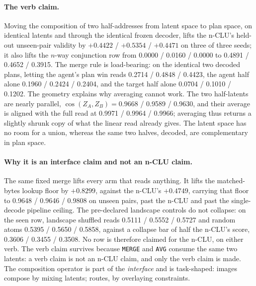 \documentclass{article} %
\begin{document}
\paragraph{The verb claim.} Moving the composition of two half-addresses from latent space to
plan space, on identical latents and through the identical frozen decoder, lifts the n-CLU's
held-out unseen-pair validity by $+0.4422$ / $+0.5354$ / $+0.4471$ on three of three seeds; it
also lifts the $n$-way conjunction row from 0.0000 / 0.0160 / 0.0000 to 0.4891 / 0.4652 / 0.3915.
The merge rule is load-bearing: on the identical two decoded plans, letting the agent's plan
win reads 0.2714 / 0.4848 / 0.4423, the agent half alone 0.1960 / 0.2424 / 0.2404, and the target
half alone 0.0704 / 0.1010 / 0.1202. %
The geometry explains why averaging cannot work. The two half-latents are nearly parallel,
$\cos(Z_A,Z_B)=0.9668$ / 0.9589 / 0.9630, and their average is aligned with the full read at
0.9971 / 0.9964 / 0.9966; averaging thus returns a slightly shrunk copy of what the linear read
already gives. The latent space has no room for a union, whereas the same two halves, decoded,
are complementary in plan space. %

\paragraph{Why it is an interface claim and not an n-CLU claim.} The same fixed merge lifts every
arm that reads anything. It lifts the matched-bytes lookup floor by $+0.8299$, against the
n-CLU's $+0.4749$, carrying that floor to 0.9648 / 0.9646 / 0.9808 on unseen pairs, past the
n-CLU and past the single-decode pipeline ceiling. %
The pre-declared landscape controls do not collapse: on the seen row, landscape shuffled reads 0.5111
/ 0.5552 / 0.5727 and random atoms 0.5395 / 0.5650 / 0.5858, against a collapse bar of
half the n-CLU's score, 0.3606 / 0.3455 / 0.3508. %
No row is therefore claimed for the n-CLU, on either verb. The verb claim survives because
\texttt{MERGE} and \texttt{AVG} consume the same two latents: a verb claim is not an n-CLU claim,
and only the verb claim is made. The composition operator is part of the \emph{interface} and is task-shaped: images compose by mixing latents; routes, by overlaying constraints.
\end{document}
